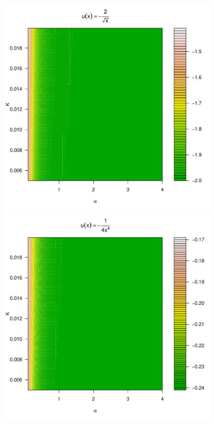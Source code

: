 \documentclass[11pt,a4]{amsart}
\newcommand{\1}{{\mathbf 1}}
\begin{document}
\begin{figure}[htb!]
\begin{minipage}{0.25\linewidth}
  \end{minipage}\hfill
  \begin{minipage}{0.25\linewidth}
    \includegraphics[width=\textwidth]{preference_pareto5e-1.pdf}
  \end{minipage}\hfill
  \begin{minipage}{0.25\linewidth}
    \includegraphics[width=\textwidth]{preference_pareto4.pdf}

\end{minipage}
\end{figure}
\end{document}
